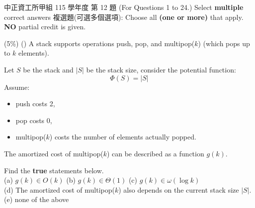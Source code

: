 \begin{pastexam}[label={px:amo-2}]{中正資工所甲組 115 學年度 第 12 題}
(For Questions 1 to 24.) Select \textbf{multiple} correct answers 複選題(可選多個選項):
Choose all \textbf{(one or more)} that apply. \textbf{NO} partial credit is given.

(5\%) (\qquad) A stack supports operations push, pop, and multipop($k$) (which pops up to
$k$ elements).

Let $S$ be the stack and $|S|$ be the stack size, consider the potential function:
\[\Phi(S)=|S|\]
Assume:
\begin{itemize}
\item push costs 2,
\item pop costs 0,
\item multipop($k$) costs the number of elements actually popped.
\end{itemize}
The amortized cost of multipop($k$) can be described as a function $g(k)$.

Find the \textbf{true} statements below.\\
(a) $g(k)\in O(k)$ \quad (b) $g(k)\in\Theta(1)$ \quad (c) $g(k)\in\omega(\log k)$\\
(d) The amortized cost of multipop($k$) also depends on the current stack size $|S|$.\\
(e) none of the above
\end{pastexam}

